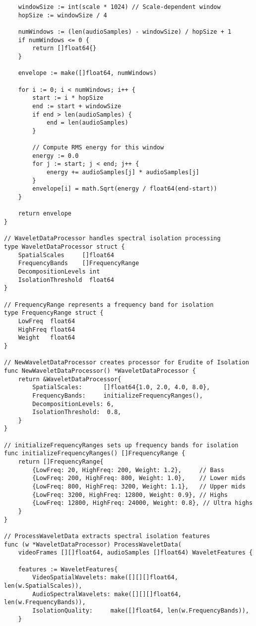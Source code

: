 \begin{tcolorbox}[colback=CodeBackground, colframe=DarkGray, title=Video-Audio Dataset Processing, fonttitle=\bfseries]
\begin{verbatim}
    windowSize := int(scale * 1024) // Scale-dependent window
    hopSize := windowSize / 4
    
    numWindows := (len(audioSamples) - windowSize) / hopSize + 1
    if numWindows <= 0 {
        return []float64{}
    }
    
    envelope := make([]float64, numWindows)
    
    for i := 0; i < numWindows; i++ {
        start := i * hopSize
        end := start + windowSize
        if end > len(audioSamples) {
            end = len(audioSamples)
        }
        
        // Compute RMS energy for this window
        energy := 0.0
        for j := start; j < end; j++ {
            energy += audioSamples[j] * audioSamples[j]
        }
        envelope[i] = math.Sqrt(energy / float64(end-start))
    }
    
    return envelope
}

// WaveletDataProcessor handles spectral isolation processing
type WaveletDataProcessor struct {
    SpatialScales     []float64
    FrequencyBands    []FrequencyRange
    DecompositionLevels int
    IsolationThreshold  float64
}

// FrequencyRange represents a frequency band for isolation
type FrequencyRange struct {
    LowFreq  float64
    HighFreq float64
    Weight   float64
}

// NewWaveletDataProcessor creates processor for Erudite of Isolation
func NewWaveletDataProcessor() *WaveletDataProcessor {
    return &WaveletDataProcessor{
        SpatialScales:      []float64{1.0, 2.0, 4.0, 8.0},
        FrequencyBands:     initializeFrequencyRanges(),
        DecompositionLevels: 6,
        IsolationThreshold:  0.8,
    }
}

// initializeFrequencyRanges sets up frequency bands for isolation
func initializeFrequencyRanges() []FrequencyRange {
    return []FrequencyRange{
        {LowFreq: 20, HighFreq: 200, Weight: 1.2},     // Bass
        {LowFreq: 200, HighFreq: 800, Weight: 1.0},    // Lower mids
        {LowFreq: 800, HighFreq: 3200, Weight: 1.1},   // Upper mids
        {LowFreq: 3200, HighFreq: 12800, Weight: 0.9}, // Highs
        {LowFreq: 12800, HighFreq: 24000, Weight: 0.8}, // Ultra highs
    }
}

// ProcessWaveletData extracts spectral isolation features
func (w *WaveletDataProcessor) ProcessWaveletData(
    videoFrames [][]float64, audioSamples []float64) WaveletFeatures {
    
    features := WaveletFeatures{
        VideoSpatialWavelets: make([][][]float64, len(w.SpatialScales)),
        AudioSpectralWavelets: make([][][]float64, len(w.FrequencyBands)),
        IsolationQuality:     make([]float64, len(w.FrequencyBands)),
    }
    

\end{verbatim}
\end{tcolorbox}
